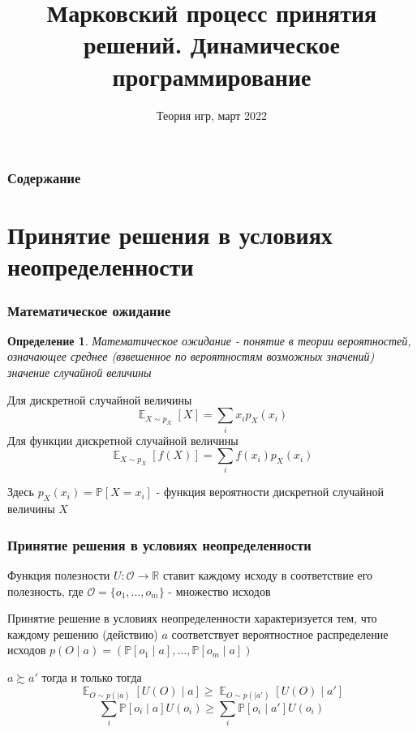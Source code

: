 \documentclass[notheorems]{beamer} %
\title[МППР] %
{Марковский процесс принятия решений. Динамическое программирование}
\date[Теория игр] %
{Теория игр, март 2022}
\newtheorem{definition}{Определение}
\begin{document}
\frame{\titlepage}


\begin{frame}
\frametitle{Содержание}
\tableofcontents
\end{frame}
\section{Принятие решения в условиях неопределенности}
\begin{frame}
	\frametitle{  Математическое ожидание}
	
\begin{definition} Математическое ожидание - понятие в теории вероятностей, означающее среднее (взвешенное по вероятностям возможных значений) значение случайной величины \end{definition}


Для дискретной случайной величины
$$\mathop{\mathbb{E}}_{X \sim p_X}[X] = \sum_{i} x_i p_X(x_i) $$
Для функции дискретной случайной величины
$$\mathop{\mathbb{E}}_{X \sim p_X}[f(X)] = \sum_{i} f(x_i) p_X(x_i) $$

Здесь $p_X(x_i) = \mathbb{P}[X=x_i] $ - функция вероятности дискретной случайной величины $X$


\end{frame}

\begin{frame}
	\frametitle{ Принятие решения в условиях неопределенности}


	Функция полезности $U: \mathcal{O} \to \mathbb{R}$ ставит каждому исходу в соответствие его полезность, где $\mathcal{O}=\{o_1, \dots , o_m \}$ - множество исходов
	
	Принятие решение в условиях неопределенности характеризуется тем, что каждому решению (действию) $a$  соответствует вероятностное распределение исходов
	$ p(O \mid a) = (\mathbb{P}[o_1 \mid a], \dots, \mathbb{P}[o_m \mid a])$
	
	$a \succsim a'$ тогда и только тогда
	$$ \mathop{\mathbb{E}}_{O \sim p( \mid a)}[U(O) \mid a] \geq \mathop{\mathbb{E}}_{O \sim p( \mid a')}[U(O) \mid a'] $$
	$$ \sum_{i}\mathbb{P}[o_i \mid a]U(o_i) \geq \sum_{i}\mathbb{P}[o_i \mid a']U(o_i) $$
	
	
\end{frame}
\end{document}

